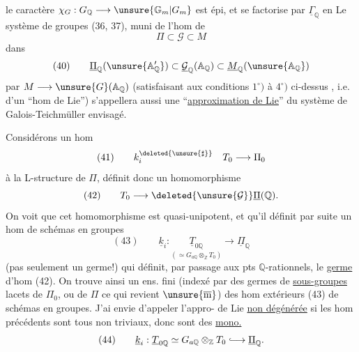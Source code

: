  le caractère $\chi_G:G_{\mathbb{Q}}\longrightarrow \unsure{\mathbb{G}_m|G_m}$ est épi, et se factorise par $\underline{\Gamma}_{\mathbb{Q}}$ en
Le système de groupes  (36, 37), muni
de l'hom de
\[
\Pi \subset \mathcal{G} \subset M
\]
dans 
\[
(40)\qquad
\underline{\Pi}_{\mathbb{Q}}(\unsure{\mathbb{A}'_{\mathbb{Q}}})
\subset \underline{\mathcal{G}}_{\mathbb{Q}}(\mathbb{A}_{\mathbb{Q}})
\subset \underline{M}_{\mathbb{Q}}(\unsure{\mathbb{A}_{\mathbb{Q}}})
\]
  par
$M\longrightarrow \unsure{G}(\mathbb{A}_{\mathbb{Q}})$ (satisfaisant
aux conditions $1^\circ)$ à $4^\circ)$ ci-dessus \deleted{\unsure{)}}, i.e.
d'un ``hom de Lie'') s'appellera aussi
une ``\uline{approximation de Lie}'' du
système de Galois-Teichmüller envisagé.

Considérons un hom
\[
(41)\qquad k_i^{\deleted{\unsure{\sharp}}}\quad T_0\longrightarrow\Pi_0
\]
 à la L-structure de $\Pi$,
définit donc 
un homomorphisme
\[
(42)\qquad T_0\longrightarrow
\deleted{\unsure{\mathcal{G}}}\underline{\Pi}(\mathbb{Q}).
\]
On voit  que cet  homomorphisme
est quasi-unipotent, et qu'il définit par
suite un hom de  schémas en groupes
\[
(43)\qquad \underline{k}_i:
\underset{(\simeq G_{a\mathbb{Q}}\otimes_{\mathbb{Z}}T_0)}{\underline{T}_{0\mathbb{Q}}}
\longrightarrow \underline{\Pi}_{\mathbb{Q}}
\]
(pas seulement un germe!)
qui définit, par  passage aux
pts $\mathbb{Q}$-rationnels, le \uline{germe} d'hom
(42). On trouve ainsi un ens. fini
(indexé par  des germes de \uline{sous-groupes}
lacets de $\Pi_0$, ou de $\Pi$ ce qui revient 
$\unsure{\overline{\mathrm m}}$) des hom extérieurs (43) de schémas
en groupes. J'ai envie d'appeler l'appro- de Lie \uline{non dégénérée} si
les hom précédents sont tous non
triviaux, donc sont des \uline{mono.}
\[
(44)\qquad \underline{k}_i:
\underline{T}_{0\mathbb{Q}}\simeq G_{a\mathbb{Q}}\otimes_{\mathbb{Z}}T_0
\lhook\joinrel\longrightarrow \underline{\Pi}_{\mathbb{Q}}.
\]

